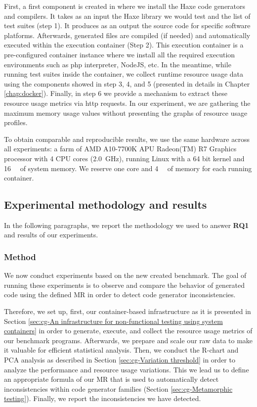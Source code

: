 First, a first component is created in where we install the Haxe code generators and compilers. It takes as an input the Haxe library we would test and the list of test suites (step 1). It produces as an output the source code for specific software platforms. Afterwards, generated files are compiled (if needed) and automatically executed within the execution container (Step 2). This execution container is a pre-configured container instance where we install all the required execution environments such as php interpreter, NodeJS, etc. 
In the meantime, while running test suites inside the container, we collect runtime resource usage data using the components showed in step 3, 4, and 5 (presented in details in Chapter \ref{chap:docker}).
Finally, in step 6 we provide a mechanism to extract these resource usage metrics via http requests. In our experiment, we are gathering the maximum memory usage values without presenting the graphs of resource usage profiles.

To obtain comparable and reproducible results, we use the same hardware across all experiments: a farm of AMD A10-7700K APU Radeon(TM) R7 Graphics processor with 4 CPU cores (\SI{2.0}{\GHz}), running Linux with a 64 bit kernel and \SI{16}{\giga\byte} of system memory. We reserve one core and \SI{4}{\giga\byte} of memory for each running container. 

\subsection{Experimental methodology and results}
In the following paragraphs, we report the methodology we used to answer \textbf{RQ1} and results of our experiments. 

\subsubsection{Method}
We now conduct experiments based on the new created benchmark. 
The goal of running these experiments is to observe and compare the behavior of generated code using the defined MR in order to detect code generator inconsistencies.

Therefore, we set up, first, our container-based infrastructure as it is presented in Section \ref{sec:cg-An infrastructure for non-functional testing using system containers} in order to generate, execute, and collect the resource usage metrics of our benchmark programs.
Afterwards, we prepare and scale our raw data to make it valuable for efficient statistical analysis. Then, we conduct the R-chart and PCA analysis as described in Section \ref{sec:cg-Variation threshold} in order to analyze the performance and resource usage variations. This we lead us to define an appropriate formula of our MR that is used to automatically detect inconsistencies within code generator families (Section \ref{sec:cg-Metamorphic testing}). Finally, we report the inconsistencies we have detected.


